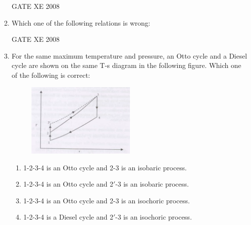 \documentclass[12pt]{article}
\begin{document}
\begin{enumerate}[label=Q\arabic*.]
\begin{enumerate}[label=(\Alph*)]
\end{enumerate}

GATE XE 2008

\item Which one of the following relations is wrong:  

\begin{enumerate}[label=(\Alph*)]
\end{enumerate}

GATE XE 2008

\item  For the same maximum temperature and pressure, an Otto cycle and a Diesel cycle are shown on the same T-s diagram in the following figure. Which one of the following is correct:  

    \begin{figure}[H]
    \centering
    \includegraphics[width=0.5\textwidth]{figs/ass1_g_q19.png}
    \caption{}
    \end{figure}
\begin{enumerate}[label=(\Alph*)]
\item  1-2-3-4 is an Otto cycle and 2-3 is an isobaric process. 
\item  1-2-3-4 is an Otto cycle and 2$'$-3 is an isobaric process. 
\item  1-2-3-4 is an Otto cycle and 2-3 is an isochoric process. 
\item  1-2-3-4 is a Diesel cycle and 2$'$-3 is an isochoric process.
\end{enumerate}


\end{enumerate}
\end{document}
